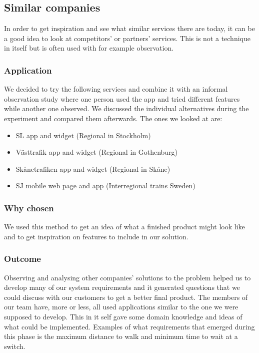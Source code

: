\documentclass[a4paper]{article}
\begin{document}
		\subsection{Similar companies}
			In order to get inspiration and see what similar services there are today, it can be a good idea to look at competitors' or partners' services. This is not a technique in itself but is often used with for example observation.
	
		\subsubsection{Application}
			We decided to try the following services and combine it with an informal observation study where one person used the app and tried different features while another one observed. We discussed the individual alternatives during the experiment and compared them afterwards. The ones we looked at are:
			\begin{itemize}
				\item SL app and widget (Regional in Stockholm)
				\item Västtrafik app and widget (Regional in Gothenburg)
				\item Skånetrafiken app and widget (Regional in Skåne)
				\item SJ mobile web page and app (Interregional trains Sweden)
			\end{itemize}
	
		\subsubsection{Why chosen}
		We used this method to get an idea of what a finished product might look like and to get inspiration on features to include in our solution.
		\subsubsection{Outcome}
		Observing and analysing other companies' solutions to the problem helped us to develop many of our system requirements and it generated questions that we could discuss with our customers to get a better final product. The members of our team have, more or less, all used applications similar to the one we were supposed to develop. This in it self gave some domain knowledge and ideas of what could be implemented. Examples of what requirements that emerged during this phase is the maximum distance to walk and minimum time to wait at a switch.
\end{document}
